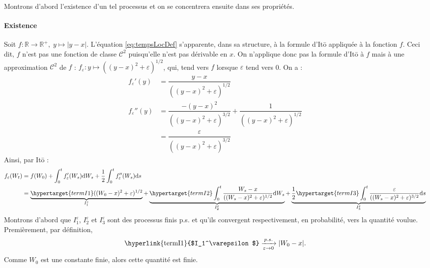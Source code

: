 \documentclass[openany]{book}
\makeatletter
\newcommand{\R}{\mathbb{R}}
\newcommand{\1}{\mathbbm{1}}
\renewcommand{\d}{\mathrm{d}}
\renewenvironment{proof}[1][\textbf{\textit{Démonstration}}]{%
  \par\pushQED{\qed}%
  \normalfont\topsep6\p@\@plus6\p@\relax
  \trivlist\item[\hskip\labelsep
    #1\@addpunct{.}]\ignorespaces
}{%
  \popQED\endtrivlist\@endpefalse
}
\theoremstyle{thmfont}
\theoremstyle{deffont}
\theoremstyle{thmfont}
\theoremstyle{deffont}
\makeatother
\begin{document}
\begin{proof} Montrons d'abord l'existence d'un tel processus et on se concentrera ensuite dans ses propriétés.

  \paragraph{Existence}
  Soit $f : \R \rightarrow \R^+,\; y \mapsto |y-x|$. L'équation \eqref{eq:tempsLocDef} s'apparente, dans sa structure, à la formule d'Itō appliquée à la fonction $f$. Ceci dit, $f$ n'est pas une fonction de classe $\mathcal C^2$ puisqu'elle n'est pas dérivable en $x$. On n'applique donc pas la formule d'Itō à $f$ mais à une approximation $\mathcal C^2$ de $f$ : $f_\varepsilon : y \mapsto ((y-x)^2 +\varepsilon)^{1/2}$, qui, tend vers $f$ lorsque $\varepsilon$ tend vers 0. On a :
  \begin{align*}
    f_\varepsilon'(y) &= \dfrac{y-x}{((y-x)^2 +\varepsilon)^{1/2}}\\
    f_\varepsilon''(y)&= \dfrac{-(y-x)^2}{((y-x)^2 +\varepsilon)^{3/2}} + \dfrac{1}{((y-x)^2 +\varepsilon)^{1/2}}\\
              &= \dfrac{\varepsilon}{((y-x)^2 +\varepsilon)^{3/2}}
  \end{align*}
  Ainsi, par Itō :
  \begin{align}
    f_\varepsilon(W_t) &= f(W_0) + \int_0^t f_\varepsilon'(W_s) \d W_s + \dfrac{1}{2} \int_0^t f_\varepsilon''(W_s) \d s\label{eq:tempsLocApprox}\\
             &= \underbrace{\hypertarget{termI1}((W_0 -x)^2 + \varepsilon)^{1/2}}_{I_1^\varepsilon}
               + \underbrace{\hypertarget{termI2}\int_0^t \dfrac{W_s-x}{((W_s-x)^2 +\varepsilon)^{1/2}}\d W_s}_{I_2^\varepsilon}
               + \underbrace{ \dfrac{1}{2} \hypertarget{termI3} \int_0^t \dfrac{\varepsilon}{((W_s-x)^2 +\varepsilon)^{3/2}} \d s}_{I_3^\varepsilon} \notag
  \end{align}
  Montrons d'abord que \hyperlink{termI1}{$I_1^\varepsilon$}, \hyperlink{termI2}{$I_2^\varepsilon$} et \hyperlink{termI1}{$I_3^\varepsilon$} sont des processus finis p.s. et qu'ils convergent respectivement, en probabilité, vers la quantité voulue. Premièrement, par définition,
  \begin{equation}\text{\hyperlink{termI1}{$I_1^\varepsilon$}} \xrightarrow[\varepsilon \to 0]{p.s.}  |W_0 -x|.\end{equation}
  \noindent Comme $W_0$ est une constante finie, alors cette quantité est finie.\\


\end{proof}
\end{document}

